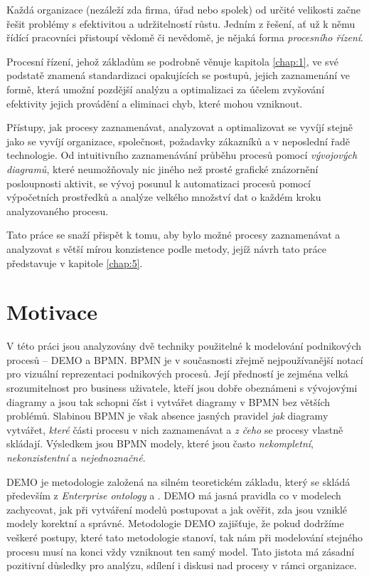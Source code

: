 Každá organizace (nezáleží zda firma, úřad nebo spolek) od určité velikosti začne řešit problémy s efektivitou a udržitelností růstu. Jedním z řešení, ať už k němu řídící pracovníci přistoupí vědomě či nevědomě, je nějaká forma \textit{procesního řízení}.

Procesní řízení, jehož základům se podrobně věnuje kapitola \ref{chap:1}, ve své podstatě znamená standardizaci opakujících se postupů, jejich zaznamenání ve formě, která umožní pozdější analýzu a optimalizaci za účelem zvyšování efektivity jejich provádění a eliminaci chyb, které mohou vzniknout.

Přístupy, jak procesy zaznamenávat, analyzovat a optimalizovat se vyvíjí stejně jako se vyvíjí organizace, společnost, požadavky zákazníků a v neposlední řadě technologie. Od intuitivního zaznamenávání průběhu procesů pomocí \textit{vývojových diagramů}, které neumožňovaly nic jiného než prosté grafické znázornění posloupnosti aktivit, se vývoj posunul k automatizaci procesů pomocí výpočetních prostředků a analýze velkého množství dat o každém kroku analyzovaného procesu.

Tato práce se snaží přispět k tomu, aby bylo možné procesy zaznamenávat a analyzovat s větší mírou konzistence podle metody, jejíž návrh tato práce představuje v kapitole \ref{chap:5}.

\section{Motivace}
V této práci jsou analyzovány dvě techniky použitelné k modelování podnikových procesů – DEMO a BPMN. BPMN je v současnosti zřejmě nejpoužívanější notací pro vizuální reprezentaci podnikových procesů. Její předností je zejména velká srozumitelnost pro business uživatele, kteří jsou dobře obeznámeni s vývojovými diagramy a jsou tak schopni číst i vytvářet diagramy v BPMN bez větších problémů. Slabinou BPMN je však absence jasných pravidel \textit{jak} diagramy vytvářet, \textit{které} části procesu v nich zaznamenávat a \textit{z čeho} se procesy vlastně skládají. Výsledkem jsou BPMN modely, které jsou často \textit{nekompletní}, \textit{nekonzistentní} a \textit{nejednoznačné}.

DEMO je metodologie založená na silném teoretickém základu, který se skládá především z \textit{Enterprise ontology} a \textit{\ptheory{}}. DEMO má jasná pravidla co v modelech zachycovat, jak při vytváření modelů postupovat a jak ověřit, zda jsou vzniklé modely korektní a správné. Metodologie DEMO zajišťuje, že pokud dodržíme veškeré postupy, které tato metodologie stanoví, tak nám při modelování stejného procesu musí na konci vždy vzniknout ten samý model. Tato jistota má zásadní pozitivní důsledky pro analýzu, sdílení i diskusi nad procesy v rámci organizace.

